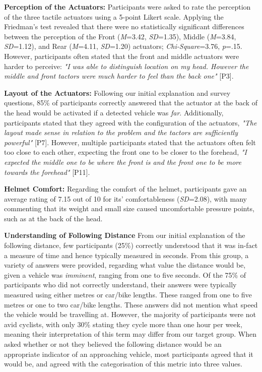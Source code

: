 \documentclass{mpaper}
\begin{document}
\textbf{Perception of the Actuators:} Participants were asked to rate the perception of the three tactile actuators using a 5-point Likert scale. Applying the Friedman's test revealed that there were no statistically significant differences between the perception of the Front (\textit{M}=3.42, \textit{SD}=1.35), Middle (\textit{M}=3.84, \textit{SD}=1.12), and Rear (\textit{M}=4.11, \textit{SD}=1.20) actuators; \textit{Chi-Square}=3.76, \textit{p}=.15. However, participants often stated that the front and middle actuators were harder to perceive: \textit{"I was able to distinguish location on my head. However the middle and front tactors were much harder to feel than the back one"} [P3].

\textbf{Layout of the Actuators:} Following our initial explanation and survey questions, 85\% of participants correctly answered that the actuator at the back of the head would be activated if a detected vehicle was \textit{far}. Additionally, participants stated that they agreed with the configuration of the actuators, \textit{"The layout made sense in relation to the problem and the tactors are sufficiently powerful"} [P7]. However, multiple participants stated that the actuators often felt too close to each other, expecting the front one to be closer to the forehead, \textit{"I expected the middle one to be where the front is and the front one to be more towards the forehead"} [P11].

\textbf{Helmet Comfort:}
Regarding the comfort of the helmet, participants gave an average rating of 7.15 out of 10 for its' comfortableness (\textit{SD}=2.08), with many commenting that its weight and small size caused uncomfortable pressure points, such as at the back of the head. 

\textbf{Understanding of Following Distance}
From our initial explanation of the following distance, few participants (25\%) correctly understood that it was in-fact a measure of time and hence typically measured in seconds. From this group, a variety of answers were provided, regarding what value the distance would be, given a vehicle was \textit{imminent}, ranging from one to five seconds. Of the 75\% of participants who did not correctly understand, their answers were typically measured using either metres or car/bike lengths. These ranged from one to five metres or one to two car/bike lengths. These answers did not mention what speed the vehicle would be travelling at. However, the majority of participants were not avid cyclists, with only 30\% stating they cycle more than one hour per week, meaning their interpretation of this term may differ from our target group. When asked whether or not they believed the following distance would be an appropriate indicator of an approaching vehicle, most participants agreed that it would be, and agreed with the categorisation of this metric into three values.
\end{document}

